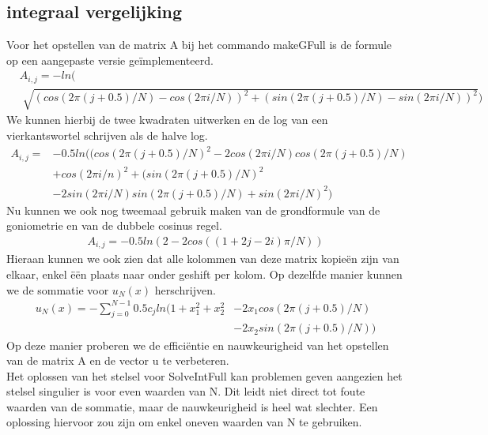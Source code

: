 \documentclass[a4paper]{article}
\begin{document}
\subsection*{integraal vergelijking}

Voor het opstellen van de matrix A bij het commando makeGFull is de formule op een aangepaste versie ge\"implementeerd.
\begin{equation}
\label{matA}
\begin{aligned}
	&A_{i,j} = -ln( \\ &\sqrt[]{(cos(2\pi (j+0.5)/N)-cos(2\pi i/N))^2
	 +(sin(2\pi (j+0.5)/N)-sin(2\pi i/N))^2})
\end{aligned}
\end{equation}
We kunnen hierbij de twee kwadraten uitwerken en de log van een vierkantswortel schrijven als de halve log.
\begin{equation}
\label{matAvoluit}
\begin{aligned}
	A_{i,j} = & -0.5ln((cos(2\pi (j+0.5)/N)^2-2cos(2\pi i/N)cos(2\pi (j+0.5)/N) \\ & + cos(2\pi i/n)^2
	 +(sin(2\pi (j+0.5)/N)^2 \\ & -2sin(2\pi i/N)sin(2\pi (j+0.5)/N)+sin(2\pi i/N)^2)
\end{aligned}
\end{equation}
Nu kunnen we ook nog tweemaal gebruik maken van de grondformule van de goniometrie en van de dubbele cosinus regel.
\begin{equation}
\label{matAkort}
\begin{aligned}
	A_{i,j} = -0.5ln(2 - 2cos((1+2j-2i)\pi/N))
\end{aligned}
\end{equation}
Hieraan kunnen we ook zien dat alle kolommen van deze matrix kopie\"en zijn van elkaar, enkel \"e\"en plaats naar onder geshift per kolom. Op dezelfde manier kunnen we de sommatie voor $u_N(x)$ herschrijven.
\begin{equation}
\label{un}
\begin{aligned}
	u_N(x) = -\sum_{j=0}^{N-1} 0.5c_jln(1+x_1^2+x_2^2 &-2x_1cos(2\pi (j+0.5)/N)\\&-2x_2sin(2\pi (j+0.5)/N))
\end{aligned}
\end{equation}
Op deze manier proberen we de effici\"entie en nauwkeurigheid van het opstellen van de matrix A en de vector u te verbeteren. \\
Het oplossen van het stelsel voor SolveIntFull kan problemen geven aangezien het stelsel singulier is voor even waarden van N. Dit leidt niet direct tot foute waarden van de sommatie, maar de nauwkeurigheid is heel wat slechter. Een oplossing hiervoor zou zijn om enkel oneven waarden van N te gebruiken.
\end{document}
